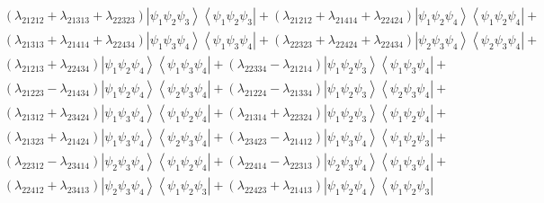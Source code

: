 \documentclass[aps,preprint]{revtex4}%
\begin{document}
\begin{align*}
& \left(  \lambda_{21212}+\lambda_{21313}+\lambda_{22323}\right)  \left\vert
\psi_{1}\psi_{2}\psi_{3}\right\rangle \left\langle \psi_{1}\psi_{2}\psi
_{3}\right\vert +\left(  \lambda_{21212}+\lambda_{21414}+\lambda
_{22424}\right)  \left\vert \psi_{1}\psi_{2}\psi_{4}\right\rangle \left\langle
\psi_{1}\psi_{2}\psi_{4}\right\vert +\\
& \left(  \lambda_{21313}+\lambda_{21414}+\lambda_{22434}\right)  \left\vert
\psi_{1}\psi_{3}\psi_{4}\right\rangle \left\langle \psi_{1}\psi_{3}\psi
_{4}\right\vert +\left(  \lambda_{22323}+\lambda_{22424}+\lambda
_{22434}\right)  \left\vert \psi_{2}\psi_{3}\psi_{4}\right\rangle \left\langle
\psi_{2}\psi_{3}\psi_{4}\right\vert +
\end{align*}%
\begin{align*}
& \left(  \lambda_{21213}+\lambda_{22434}\right)  \left\vert \psi_{1}\psi
_{2}\psi_{4}\right\rangle \left\langle \psi_{1}\psi_{3}\psi_{4}\right\vert
+\left(  \lambda_{22334}-\lambda_{21214}\right)  \left\vert \psi_{1}\psi
_{2}\psi_{3}\right\rangle \left\langle \psi_{1}\psi_{3}\psi_{4}\right\vert
+\\
& \left(  \lambda_{21223}-\lambda_{21434}\right)  \left\vert \psi_{1}\psi
_{2}\psi_{4}\right\rangle \left\langle \psi_{2}\psi_{3}\psi_{4}\right\vert
+\left(  \lambda_{21224}-\lambda_{21334}\right)  \left\vert \psi_{1}\psi
_{2}\psi_{3}\right\rangle \left\langle \psi_{2}\psi_{3}\psi_{4}\right\vert
+\\
& \left(  \lambda_{21312}+\lambda_{23424}\right)  \left\vert \psi_{1}\psi
_{3}\psi_{4}\right\rangle \left\langle \psi_{1}\psi_{2}\psi_{4}\right\vert
+\left(  \lambda_{21314}+\lambda_{22324}\right)  \left\vert \psi_{1}\psi
_{2}\psi_{3}\right\rangle \left\langle \psi_{1}\psi_{2}\psi_{4}\right\vert
+\\
& \left(  \lambda_{21323}+\lambda_{21424}\right)  \left\vert \psi_{1}\psi
_{3}\psi_{4}\right\rangle \left\langle \psi_{2}\psi_{3}\psi_{4}\right\vert
+\left(  \lambda_{23423}-\lambda_{21412}\right)  \left\vert \psi_{1}\psi
_{3}\psi_{4}\right\rangle \left\langle \psi_{1}\psi_{2}\psi_{3}\right\vert +
\end{align*}%
\begin{align}
& \left(  \lambda_{22312}-\lambda_{23414}\right)  \left\vert \psi_{2}\psi
_{3}\psi_{4}\right\rangle \left\langle \psi_{1}\psi_{2}\psi_{4}\right\vert
+\left(  \lambda_{22414}-\lambda_{22313}\right)  \left\vert \psi_{2}\psi
_{3}\psi_{4}\right\rangle \left\langle \psi_{1}\psi_{3}\psi_{4}\right\vert
+\nonumber\\
& \left(  \lambda_{22412}+\lambda_{23413}\right)  \left\vert \psi_{2}\psi
_{3}\psi_{4}\right\rangle \left\langle \psi_{1}\psi_{2}\psi_{3}\right\vert
+\left(  \lambda_{22423}+\lambda_{21413}\right)  \left\vert \psi_{1}\psi
_{2}\psi_{4}\right\rangle \left\langle \psi_{1}\psi_{2}\psi_{3}\right\vert
\end{align}
%
\end{document}
